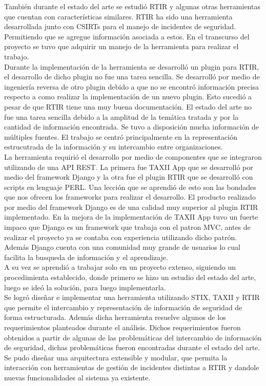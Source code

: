 \bigskip
También durante el estado del arte se estudió RTIR y algunas otras herramientas que cuentan con características similares. RTIR ha sido una herramienta desarrollada junto con CSIRTs para el manejo de incidentes de seguridad. Permitiendo que se agregue información asociada a estos. En el transcurso del proyecto se tuvo que adquirir un manejo de la herramienta para realizar el trabajo.\\
Durante la implementación de la herramienta se desarrolló un plugin para RTIR, el desarrollo de dicho plugin no fue una tarea sencilla. Se desarrolló por medio de ingeniería reversa de otro plugin debido a que no se encontró información precisa respecto a como realizar la implementación de un nuevo plugin. Esto sucedió a pesar de que RTIR tiene una muy buena documentación.
\bigskip
El estado del arte no fue una tarea sencilla debido a la amplitud de la temática tratada y por la cantidad de información encontrada. Se tuvo a disposición mucha información de múltiples fuentes. El trabajo se centró principalmente en la representación estrucutrada de la información y su intercambio entre organizaciones.\\
\bigskip
La herramienta requirió el desarrollo por medio de componentes que se integraron utilizando de una API REST. La primera fue TAXII App que se desarrolló por medio del framework Django y la otra fue el plugin RTIR que se desarrolló con scripts en lenguaje PERL.
Una lección que se aprendió de esto son las bondades que nos ofrecen los frameworks para realizar el desarrollo. El producto realizado por medio del framework Django es de una calidad muy superior al plugin RTIR implementado. En la mejora de la implementación de TAXII App tuvo un fuerte impaco que Django es un framework que trabaja con el patron MVC, antes de realizar el proyecto ya se contaba con experiencia utilizando dicho patrón. Además Django cuenta con una comunidad muy grande de usuarios lo cual facilita la busqueda de información y el aprendizaje.\\
\bigskip
A su vez se aprendió a trabajar solo en un proyecto extenso, siguiendo un procedimienta establecido, donde primero se hizo un estudio del estado del arte, luego se ideó la solución, para luego implementarla.\\
\bigskip
Se logró diseñar e implementar una herramienta utilizando STIX, TAXII y RTIR que permite el intercambio y representación de información de seguridad de forma estructurada. Además dicha herramienta resuelve algunos de los requerimientos planteados durante el análisis. Dichos requerimientos fueron obtenidos a partir de algunas de las problemáticas del intercambio de información de seguridad, dichas problemáticas fueron encontradas durante el estado del arte.\\
Se pudo diseñar una arquitectura extensible y modular, que permita la interacción con herramientas de gestión de incidentes distintas a RTIR y dandole nuevas funcionalidades al sistema ya existente.\\

